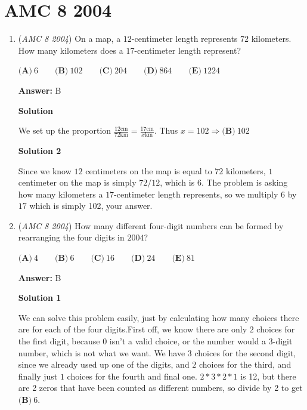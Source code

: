\section{AMC 8 2004}
        \begin{enumerate}
        	\item (\textit{AMC 8 2004}) On a map, a $12$-centimeter length represents $72$ kilometers. How many kilometers does a $17$-centimeter length represent?


 $\textbf{(A)}\ 6\qquad\textbf{(B)}\ 102\qquad\textbf{(C)}\ 204\qquad\textbf{(D)}\ 864\qquad\textbf{(E)}\ 1224$

 \textbf{Answer: }B



\textbf{Solution}

We set up the proportion  $\frac{12  \text{cm}}{72  \text{km}}=\frac{17 \text{cm}}{x \text{km}}$. Thus $x=102 \Rightarrow \boxed{\textbf{(B)}\ 102}$




\textbf{Solution 2}

Since we know $12$ centimeters on the map is equal to $72$ kilometers, $1$ centimeter on the map is simply $72/12$, which is $6$. The problem is asking how many kilometers a $17$-centimeter length represents, so we multiply $6$ by $17$ which is simply 102, your answer.

 


	\item (\textit{AMC 8 2004}) How many different four-digit numbers can be formed by rearranging the four digits in $2004$?


 $\textbf{(A)}\ 4\qquad\textbf{(B)}\ 6\qquad\textbf{(C)}\ 16\qquad\textbf{(D)}\ 24\qquad\textbf{(E)}\ 81$

 \textbf{Answer: }B



\textbf{Solution 1}

We can solve this problem easily, just by calculating how many choices there are for each of the four digits.First off, we know there are only $2$ choices for the first digit, because $0$ isn't a valid choice, or the number would a 3-digit number, which is not what we want. We have $3$ choices for the second digit, since we already used up one of the digits, and $2$ choices for the third, and finally just $1$ choices for the fourth and final one. $2*3*2*1$ is 12, but there are 2 zeros that have been counted as different numbers, so divide by 2 to get  $\boxed{\textbf{(B)}\ 6}$.

 




\end{enumerate}
